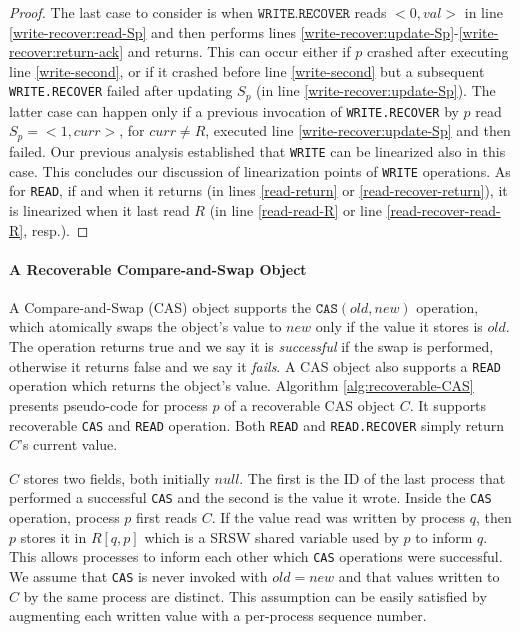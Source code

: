 \begin{proof}
The last case to consider is when $\texttt{WRITE.RECOVER}$ reads ${<}0,val{>}$ in line \ref{write-recover:read-Sp} and then performs lines \ref{write-recover:update-Sp}-\ref{write-recover:return-ack} and returns. This can occur either if $p$ crashed after executing line \ref{write-second}, or if it crashed before line \ref{write-second} but a subsequent  \texttt{WRITE.RECOVER} failed after updating $S_p$ (in line \ref{write-recover:update-Sp}). The latter case can happen only if a previous invocation of \texttt{WRITE.RECOVER} by $p$ read $S_p=<1,curr>$, for $curr \neq R$, executed line \ref{write-recover:update-Sp} and then failed. Our previous analysis established that \texttt{WRITE} can be linearized also in this case. This concludes our discussion of linearization points of \texttt{WRITE} operations. As for \texttt{READ}, if and when it returns (in lines \ref{read-return} or \ref{read-recover-return}), it is linearized when it last read $R$ (in line \ref{read-read-R} or line \ref{read-recover-read-R}, resp.).
\end{proof}


\paragraph*{A Recoverable Compare-and-Swap Object}

A Compare-and-Swap (CAS) object supports the $\texttt{CAS}(old,new)$ operation, which atomically swaps the object's value to $new$ only if the value it stores is $old$. The operation returns true and we say it is \emph{successful} if the swap is performed, otherwise it returns false and we say it \emph{fails}. A CAS object also supports a \texttt{READ} operation which returns the object's value. Algorithm \ref{alg:recoverable-CAS} presents  pseudo-code for process $p$ of a recoverable CAS object $C$. It supports recoverable \texttt{CAS} and \texttt{READ} operation. Both \texttt{READ} and \texttt{READ.RECOVER} simply return $C$'s current value.

$C$ stores two fields, both initially $null$. The first is the ID of the last process that performed a successful \texttt{CAS} and the second is the value it wrote. Inside the \texttt{CAS} operation, process $p$ first reads $C$. If the value read was written by process $q$, then $p$ stores it in $R[q,p]$ which is a SRSW shared variable used by $p$ to inform $q$. This allows processes to inform each other which \texttt{CAS} operations were successful. We assume that \texttt{CAS} is never invoked with $old=new$ and that values written to $C$ by the same process are distinct. This assumption can be easily satisfied by augmenting each written value with a per-process sequence number.

